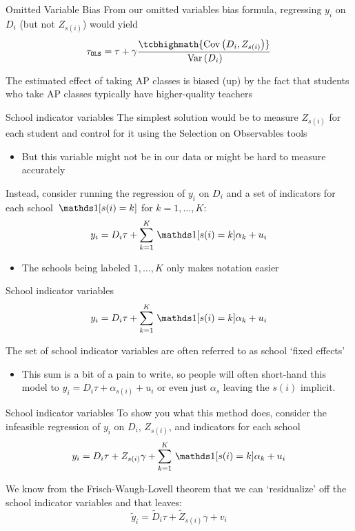 \documentclass[aspectratio=169,t,11pt,table]{beamer}
\begin{document}
\begin{frame}{Omitted Variable Bias}
  From our omitted variables bias formula, regressing $y_i$ on $D_i$ (but not $Z_{s(i)}$) would yield
  $$
    \tau_{\texttt{OLS}} = \tau + \gamma \frac{ \tcbhighmath{\cov{D_i, Z_{s(i)}}} }{\var{D_i}}
  $$

  \bigskip
  The estimated effect of taking AP classes is biased (up) by the fact that {\color{raspberry} students who take AP classes typically have higher-quality teachers}
\end{frame}

\begin{frame}{School indicator variables}
  The simplest solution would be to measure $Z_{s(i)}$ for each student and control for it using the Selection on Observables tools
  \begin{itemize}
    \item But this variable might not be in our data or might be hard to measure accurately
  \end{itemize}

  \pause
  \hugeskip
  Instead, consider running the regression of $y_i$ on $D_i$ and a set of indicators for each school $\one{s(i) = k}$ for $k = 1, \dots, K$:
  $$
    y_i = D_i \tau + \sum_{k=1}^K \one{s(i) = k} \alpha_k + u_i
  $$

  \begin{itemize}
    \item The schools being labeled $1, \dots, K$ only makes notation easier
  \end{itemize}
\end{frame}

\begin{frame}{School indicator variables}
  \vspace*{-\bigskipamount}
  $$
    y_i = D_i \tau + \sum_{k=1}^K \one{s(i) = k} \alpha_k + u_i
  $$

  \bigskip
  The set of school indicator variables are often referred to as \alert{school `fixed effects'}
  \begin{itemize}
    \item This sum is a bit of a pain to write, so people will often short-hand this model to $y_i = D_i \tau + \alpha_{s(i)} + u_i$ or even just $\alpha_s$ leaving the $s(i)$ implicit.
  \end{itemize}
\end{frame}

\begin{frame}{School indicator variables}
  To show you what this method does, consider the infeasible regression of $y_i$ on $D_i$, $Z_{s(i)}$, and indicators for each school
  $$
    y_i = D_i \tau + Z_{s(i)} \gamma + \sum_{k=1}^K \one{s(i) = k} \alpha_k + u_i
  $$

  \bigskip
  We know from the Frisch-Waugh-Lovell theorem that we can `residualize' off the school indicator variables and that leaves:
  $$
    \tilde{y}_i = \tilde{D}_i \tau + \tilde{Z}_{s(i)} \gamma + v_i
  $$
\end{frame}
\end{document}
